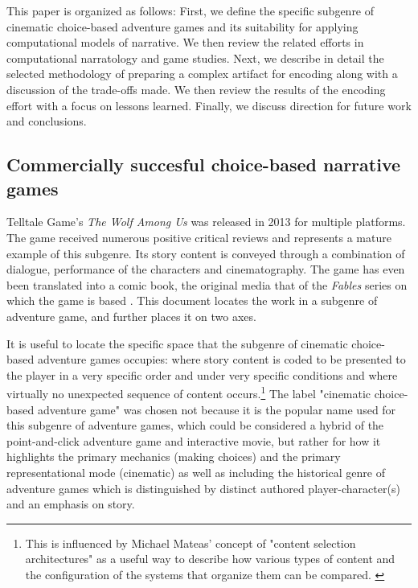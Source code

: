 This paper is organized as follows: First, we define the specific
subgenre of cinematic choice-based adventure games and its suitability
for applying computational models of narrative. We then review the
related efforts in computational narratology and game studies. Next,
we describe in detail the selected methodology of preparing a complex
artifact for encoding along with a discussion of the trade-offs
made. We then review the results of the encoding effort with a focus
on lessons learned. Finally, we discuss direction for future work and
conclusions.

\subsection{Commercially succesful choice-based narrative games}
\label{sec:orgheadline1}

Telltale Game's \emph{The Wolf Among Us} was released in 2013 for multiple
platforms. The game received numerous positive critical reviews and
represents a mature example of this subgenre. Its story content is
conveyed through a combination of dialogue, performance of the
characters and cinematography. The game has even been translated into
a comic book, the original media that of the \emph{Fables} series on which
the game is based \cite{Sturges2014}. This document locates the work
in a subgenre of adventure game, and further places it on two axes.

It is useful to locate the specific space that the subgenre of
cinematic choice-based adventure games occupies: where story content
is coded to be presented to the player in a very specific order and
under very specific conditions and where virtually no unexpected
sequence of content occurs.\footnote{This is influenced by Michael Mateas' concept of "content
selection architectures" as a useful way to describe how various types
of content and the configuration of the systems that organize them can
be compared. \cite{Mateas2015}} The label "cinematic choice-based
adventure game" was chosen not because it is the popular name used for
this subgenre of adventure games, which could be considered a hybrid
of the point-and-click adventure game and interactive movie, but
rather for how it highlights the primary mechanics (making choices)
and the primary representational mode (cinematic) as well as including
the historical genre of adventure games which is distinguished by
distinct authored player-character(s) and an emphasis on story.

